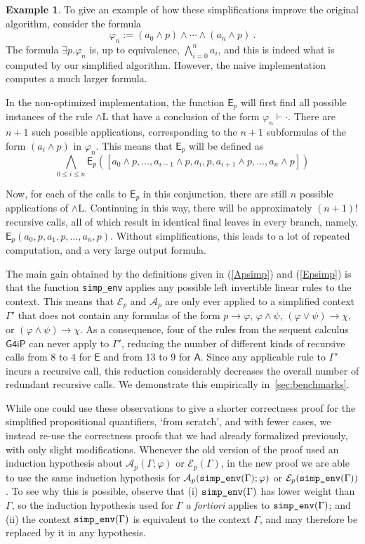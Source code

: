 \documentclass[english,review]{jflart}
\theoremstyle{definition}
\newtheorem{example}[definition]{Example}
\theoremstyle{plain}
\newcommand{\simpenv}[1]{\mbox{\texttt{simp\_env}}(#1)}
\newcommand{\Ep}[1]{\mathsf{E}_{p}(#1)}
\renewcommand{\phi}{\varphi}
\newcommand{\Gfourip}{\mathsf{G4iP}}
\begin{document}
\begin{example}
	To give an example of how these simplifications improve the original algorithm, consider the formula
$$
	\phi_n := {(a_0 \wedge p) \wedge \cdots \wedge(a_n \wedge p)}\ .
$$
The formula $\exists p. \phi_n$ is, up to equivalence, $\bigwedge_{i=0}^n a_i$, and this is indeed what is computed by our simplified algorithm. However, the naive implementation computes a much larger formula.

In the non-optimized implementation, the function $\mathsf{E}_p$ will first find all possible instances of the rule ${\wedge \mathrm L}$ that have a conclusion of the form $\phi_n \vdash \cdot$. There are $n+1$ such possible applications, corresponding to the $n+1$ subformulas of the form $(a_i \wedge p)$ in $\phi_n$. This means that $\mathsf{E}_p$ will be defined as
$$\bigwedge_{0\le i\le n} \Ep{[a_0 \wedge p, \dots, a_{i-1} \wedge p, a_i, p , a_{i+1} \wedge p, \dots, a_n \wedge p]}$$

Now, for each of the calls to $\mathsf{E}_p$ in this conjunction, there are still $n$ possible applications of ${\wedge \mathrm L}$. Continuing in this way, there will be approximately $(n+1)!$ recursive calls, all of which result in identical final leaves in every branch, namely, $\Ep{a_0, p, a_1, p, \dots, a_n, p}$. Without simplifications, this leads to a lot of repeated computation, and a very large output formula.
\end{example}
The main gain obtained by the definitions given in (\ref{Apsimp}) and (\ref{Epsimp}) is that the function \texttt{simp\_env} applies any possible left invertible linear rules to the context. This means that $\mathcal{E}_p$ and $\mathcal{A}_p$ are only ever applied to a simplified context $\Gamma'$ that does not contain any formulas of the form $p \to \phi$, $\phi \wedge \psi$, $(\phi \vee \psi) \to \chi$, or $(\phi \wedge \psi) \to \chi$. As a consequence, four of the rules from the sequent calculus $\Gfourip$ can never apply to $\Gamma'$, reducing the number of different kinds of recursive calls from $8$ to $4$ for $\mathsf{E}$ and from $13$ to $9$ for $\mathsf{A}$. Since any applicable rule to $\Gamma'$ incurs a recursive call, this reduction considerably decreases the overall number of redundant recursive calls. We demonstrate this empirically in~\cref{sec:benchmarks}.

While one could use these observations to give a shorter correctness proof for the simplified propositional quantifiers, `from scratch', and with fewer cases, we instead re-use the correctness proofs that we had already formalized previously, with only slight modifications. Whenever the old version of the proof used an induction hypothesis about $\mathcal{A}_p(\Gamma; \phi)$ or $\mathcal{E}_p(\Gamma)$, in the new proof we are able to use the same induction hypothesis for $\mathcal{A}_p(\simpenv{\Gamma}; \phi)$ or $\mathcal{E}_p(\simpenv{\Gamma})$. To see why this is possible, observe that (i) $\simpenv{\Gamma}$ has lower weight than $\Gamma$, so the induction hypothesis used for $\Gamma$ \emph{a fortiori}  applies to $\simpenv{\Gamma}$; and (ii) the context $\simpenv{\Gamma}$ is equivalent to the context $\Gamma$, and may therefore be replaced by it in any hypothesis.
\end{document}
